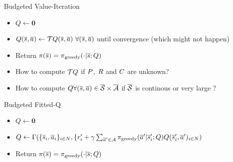 \documentclass[french,handout]{beamer}
\begin{document}
    \begin{frame}

        \begin{block}{Budgeted Value-Iteration}
            \begin{itemize}
                \item $Q \leftarrow \mathbf{0}$
                \item $Q(\os,\oa) \leftarrow \bo Q(\os,\oa)\ \forall (\os,\oa)$ until convergence (which might not happen)
                \item Return $\pi(\overline{s}) = \pi_\text{greedy}(\cdot|\overline{s}; Q)$
            \end{itemize}
        \end{block}

        \begin{alertblock}{}
            \begin{itemize}
                \item How to compute $\mathcal{T} Q$ if $P$, $R$ and $C$ are unknown?
                \item How to compute $Q \forall (\overline{s},\overline{a}) \in \overline{\mathcal{S}}\times\overline{\mathcal{A}}$ if $\overline{\mathcal{S}}$ is continous or very large ?
            \end{itemize}

        \end{alertblock}

        \begin{block}{Budgeted Fitted-Q}
            \begin{itemize}
                \item $Q \leftarrow \mathbf{0}$
                \item $Q \leftarrow \Gamma(\{\overline{s}_{i},\overline{a}_{i}\}_{{i}\in N},\{r'_{i} + \gamma \sum_{\overline{a}'\in \mathcal{A}} \pi_\text{greedy}(\overline{a}'|\overline{s}'_{i}; Q) Q(\overline{s}'_{i}, \overline{a}')_{{i} \in N})$
                \item Return $\pi(\overline{s}) = \pi_\text{greedy}(\cdot|\overline{s}; Q)$
            \end{itemize}
        \end{block}
    \end{frame}
\end{document}
